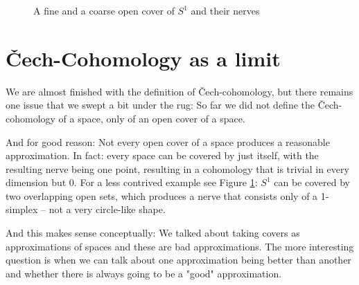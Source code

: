 \begin{figure}
	\centering
	\begin{tcolorbox}[segmentation style={solid}]
	    \begin{tcbraster}[raster columns=2]
		\end{tcbraster}
		\tcblower
		\begin{tcbraster}[raster columns=2]
	    \end{tcbraster}
	\end{tcolorbox}
	\label{figure:circle_nerves}
	\caption{A fine and a coarse open cover of $S^1$ and their nerves}
\end{figure}

\section{Čech-Cohomology as a limit}
We are almost finished with the definition of Čech-cohomology, but there remains one issue that we
swept a bit under the rug: So far we did not define the Čech-cohomology of a space, only of an open
cover of a space.

And for good reason: Not every open cover of a space produces a reasonable approximation. In fact: every
space can be covered by just itself, with the resulting nerve being one point, resulting in a cohomology
that is trivial in every dimension but 0. For a less contrived example see Figure \ref{figure:circle_nerves}:
$S^1$ can be covered by two overlapping open sets, which produces a nerve that consists only of a 1-simplex –
not a very circle-like shape.

And this makes sense conceptually: We talked about taking covers as approximations of spaces
and these are bad approximations. The more interesting question is when we can talk about one approximation being better
than another and whether there is always going to be a "good" approximation. 

